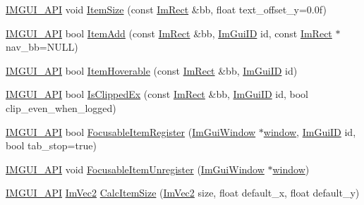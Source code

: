 \begin{DoxyCompactItemize}
\item 
\mbox{\hyperlink{imgui_8h_a43829975e84e45d1149597467a14bbf5}{I\+M\+G\+U\+I\+\_\+\+A\+PI}} void \mbox{\hyperlink{namespace_im_gui_a97b821f022e36964b40973fe1ff4367b}{Item\+Size}} (const \mbox{\hyperlink{struct_im_rect}{Im\+Rect}} \&bb, float text\+\_\+offset\+\_\+y=0.\+0f)
\item 
\mbox{\hyperlink{imgui_8h_a43829975e84e45d1149597467a14bbf5}{I\+M\+G\+U\+I\+\_\+\+A\+PI}} bool \mbox{\hyperlink{namespace_im_gui_aa6e503009550f5e42d6eb4c146090929}{Item\+Add}} (const \mbox{\hyperlink{struct_im_rect}{Im\+Rect}} \&bb, \mbox{\hyperlink{imgui_8h_a1785c9b6f4e16406764a85f32582236f}{Im\+Gui\+ID}} id, const \mbox{\hyperlink{struct_im_rect}{Im\+Rect}} $\ast$nav\+\_\+bb=N\+U\+LL)
\item 
\mbox{\hyperlink{imgui_8h_a43829975e84e45d1149597467a14bbf5}{I\+M\+G\+U\+I\+\_\+\+A\+PI}} bool \mbox{\hyperlink{namespace_im_gui_a488b86a9f235923304186fb86ff64ffb}{Item\+Hoverable}} (const \mbox{\hyperlink{struct_im_rect}{Im\+Rect}} \&bb, \mbox{\hyperlink{imgui_8h_a1785c9b6f4e16406764a85f32582236f}{Im\+Gui\+ID}} id)
\item 
\mbox{\hyperlink{imgui_8h_a43829975e84e45d1149597467a14bbf5}{I\+M\+G\+U\+I\+\_\+\+A\+PI}} bool \mbox{\hyperlink{namespace_im_gui_a8674467ae34d04bc99df1f7f98f47407}{Is\+Clipped\+Ex}} (const \mbox{\hyperlink{struct_im_rect}{Im\+Rect}} \&bb, \mbox{\hyperlink{imgui_8h_a1785c9b6f4e16406764a85f32582236f}{Im\+Gui\+ID}} id, bool clip\+\_\+even\+\_\+when\+\_\+logged)
\item 
\mbox{\hyperlink{imgui_8h_a43829975e84e45d1149597467a14bbf5}{I\+M\+G\+U\+I\+\_\+\+A\+PI}} bool \mbox{\hyperlink{namespace_im_gui_ab1e2f7069edbab669b56e93e30930c45}{Focusable\+Item\+Register}} (\mbox{\hyperlink{struct_im_gui_window}{Im\+Gui\+Window}} $\ast$\mbox{\hyperlink{radar_8cpp_a80de27bd7dc4e2b2ad3d5895b97a70f0}{window}}, \mbox{\hyperlink{imgui_8h_a1785c9b6f4e16406764a85f32582236f}{Im\+Gui\+ID}} id, bool tab\+\_\+stop=true)
\item 
\mbox{\hyperlink{imgui_8h_a43829975e84e45d1149597467a14bbf5}{I\+M\+G\+U\+I\+\_\+\+A\+PI}} void \mbox{\hyperlink{namespace_im_gui_a390518fcaef04b4d399d2475d4d84df7}{Focusable\+Item\+Unregister}} (\mbox{\hyperlink{struct_im_gui_window}{Im\+Gui\+Window}} $\ast$\mbox{\hyperlink{radar_8cpp_a80de27bd7dc4e2b2ad3d5895b97a70f0}{window}})
\item 
\mbox{\hyperlink{imgui_8h_a43829975e84e45d1149597467a14bbf5}{I\+M\+G\+U\+I\+\_\+\+A\+PI}} \mbox{\hyperlink{struct_im_vec2}{Im\+Vec2}} \mbox{\hyperlink{namespace_im_gui_a3c1505e785f9571ed82500692a727c5f}{Calc\+Item\+Size}} (\mbox{\hyperlink{struct_im_vec2}{Im\+Vec2}} size, float default\+\_\+x, float default\+\_\+y)

\end{DoxyCompactItemize}
